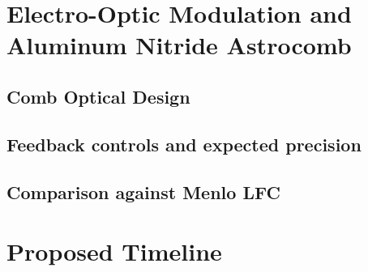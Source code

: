 \documentclass[modern]{aastex61}
\begin{document}
\section{Electro-Optic Modulation and Aluminum Nitride Astrocomb}

\subsection{Comb Optical Design}

\subsection{Feedback controls and expected precision}

\subsection{Comparison against Menlo LFC}

\section{Proposed Timeline}

\pagebreak



\end{document}

